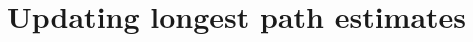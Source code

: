 \documentclass[12pt]{article}
\def\P{\mathbb{P}}
\def\E{\mathbb{E}}
\DeclareMathOperator*{\argmax}{arg\,max}
\newtheorem{prop}[theorem]{Proposition}
\begin{document}
  



\section{Updating longest path estimates}
\label{sect.updating}
\end{document}
